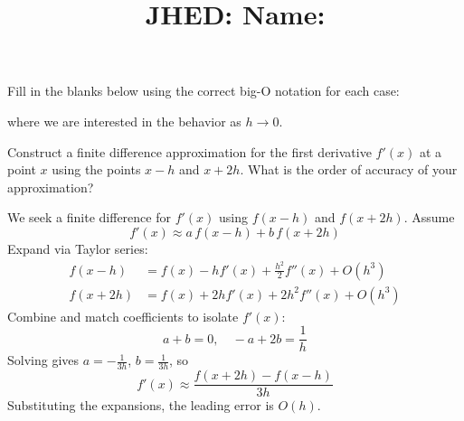 \documentclass[reqno]{exam}
\title{\normalsize{
  JHED: \underline{\hspace{4cm}} \hspace{1em} Name: \underline{\hspace{9cm}}}
   }
\author{}
\date{}
\begin{document}
\maketitle
\vspace{-2cm} %

\begin{questions}
    \question[4] 
  Fill in the blanks below using the correct big-O notation for each case:\vspace{1.5ex}
  where we are interested in the behavior as $h \to 0$.

  \question[8]
  Construct a finite difference approximation for the first derivative $f'(x)$ at a point $x$ using the points $x - h$ and $x + 2h$. What is the order of accuracy of your approximation?

  \begin{solution}
    We seek a finite difference for $f'(x)$ using $f(x-h)$ and $f(x+2h)$. Assume
    \[
      f'(x) \approx a\, f(x-h) + b\, f(x+2h)
    \]
    Expand via Taylor series:
    \begin{align*}
      f(x-h) &= f(x) - h f'(x) + \frac{h^2}{2} f''(x) + O(h^3) \\
      f(x+2h) &= f(x) + 2h f'(x) + 2h^2 f''(x) + O(h^3)
    \end{align*}
    Combine and match coefficients to isolate $f'(x)$:
    \[
      a + b = 0, \quad -a + 2b = \frac{1}{h}
    \]
    Solving gives $a = -\frac{1}{3h}$, $b = \frac{1}{3h}$, so
    \[
      f'(x) \approx \frac{f(x+2h) - f(x-h)}{3h}
    \]
    Substituting the expansions, the leading error is $O(h)$.


\end{solution}
\end{questions}
\end{document}
